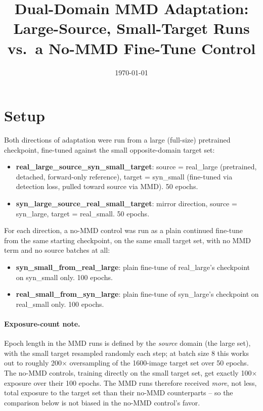 \documentclass[11pt]{article}
\title{Dual-Domain MMD Adaptation: Large-Source, Small-Target Runs vs.\ a No-MMD
Fine-Tune Control}
\author{}
\date{\today}
\begin{document}
\maketitle

\section{Setup}

Both directions of adaptation were run from a large (full-size) pretrained checkpoint,
fine-tuned against the small opposite-domain target set:

\begin{itemize}
    \item \textbf{real\_large\_source\_syn\_small\_target}: source = real\_large
    (pretrained, detached, forward-only reference), target = syn\_small (fine-tuned via
    detection loss, pulled toward source via MMD). 50 epochs.
    \item \textbf{syn\_large\_source\_real\_small\_target}: mirror direction, source =
    syn\_large, target = real\_small. 50 epochs.
\end{itemize}

For each direction, a no-MMD control was run as a plain continued fine-tune from the
same starting checkpoint, on the same small target set, with no MMD term and no source
batches at all:

\begin{itemize}
    \item \textbf{syn\_small\_from\_real\_large}: plain fine-tune of real\_large's
    checkpoint on syn\_small only. 100 epochs.
    \item \textbf{real\_small\_from\_syn\_large}: plain fine-tune of syn\_large's
    checkpoint on real\_small only. 100 epochs.
\end{itemize}

\paragraph{Exposure-count note.} Epoch length in the MMD runs is defined by the
\emph{source} domain (the large set), with the small target resampled randomly each
step; at batch size 8 this works out to roughly 200$\times$ oversampling of the
1600-image target set over 50 epochs. The no-MMD controls, training directly on the
small target set, get exactly 100$\times$ exposure over their 100 epochs. The MMD runs
therefore received \emph{more}, not less, total exposure to the target set than their
no-MMD counterparts -- so the comparison below is not biased in the no-MMD control's
favor.
\end{document}
